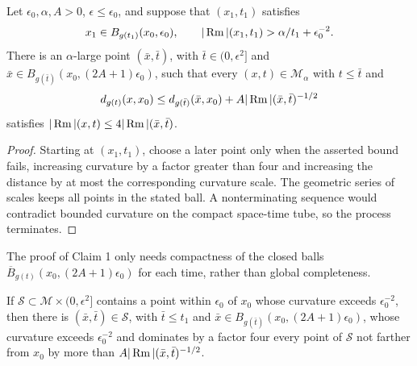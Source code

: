 \begin{claim}
\label{clm:chow-iii-point-picking-claim-one}


Let \(\epsilon_0,\alpha,A>0\), \(\epsilon\le\epsilon_0\), and suppose that
\((x_1,t_1)\) satisfies
\[
 x_1\in B_{g(t_1)}(x_0,\epsilon_0),\qquad
 |\operatorname{Rm}|(x_1,t_1)>\alpha/t_1+\epsilon_0^{-2}.
\]
There is an \(\alpha\)-large point \((\bar x,\bar t)\), with
\(\bar t\in(0,\epsilon^2]\) and
\(\bar x\in B_{g(\bar t)}(x_0,(2A+1)\epsilon_0)\), such that every
\((x,t)\in\mathcal M_\alpha\) with \(t\le\bar t\) and
\[
 d_{g(t)}(x,x_0)\le d_{g(\bar t)}(\bar x,x_0)+A|\operatorname{Rm}|(\bar x,\bar t)^{-1/2}
\]
satisfies \(|\operatorname{Rm}|(x,t)\le4|\operatorname{Rm}|(\bar x,\bar t)\).
\end{claim}
\begin{proof}
\sketch Starting at \((x_1,t_1)\), choose a later point only when the asserted bound
fails, increasing curvature by a factor greater than four and increasing the
distance by at most the corresponding curvature scale.  The geometric series
of scales keeps all points in the stated ball.  A nonterminating sequence would
contradict bounded curvature on the compact space-time tube, so the process
terminates.
\end{proof}

\begin{remark}
\label{rem:chow-iii-point-picking-compactness}


The proof of Claim 1 only needs compactness of the closed balls
\(\overline B_{g(t)}(x_0,(2A+1)\epsilon_0)\) for each time, rather than global
completeness.
\end{remark}

\begin{lemma}
\label{lem:chow-iii-point-picking-subset}


If \(\mathcal S\subset\mathcal M\times(0,\epsilon^2]\) contains a point within
\(\epsilon_0\) of \(x_0\) whose curvature exceeds \(\epsilon_0^{-2}\), then
there is \((\bar x,\bar t)\in\mathcal S\), with \(\bar t\le t_1\) and
\(\bar x\in B_{g(\bar t)}(x_0,(2A+1)\epsilon_0)\), whose curvature exceeds
\(\epsilon_0^{-2}\) and dominates by a factor four every point of \(\mathcal S\)
not farther from \(x_0\) by more than \(A|\operatorname{Rm}|(\bar x,\bar t)^{-1/2}\).
\end{lemma}

